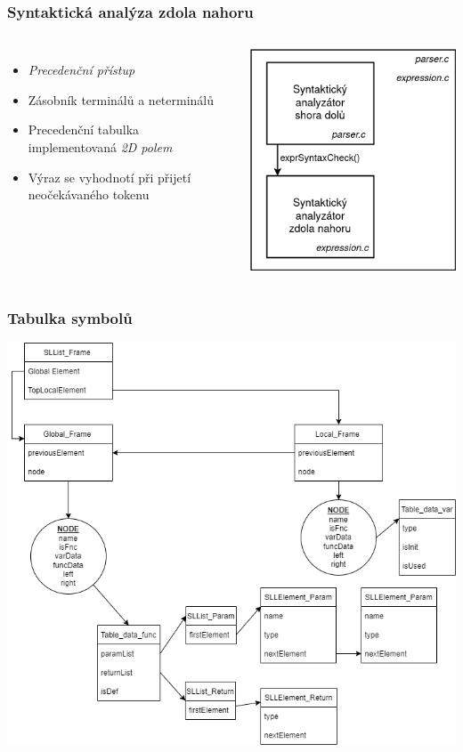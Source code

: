 \begin{frame}\frametitle{Syntaktická analýza zdola nahoru}
  \begin{columns}
    \begin{itemize}
    \setlength\itemsep{1em}
        \item \emph{Precedenční přístup}
        \item Zásobník terminálů a neterminálů
        \item Precedenční tabulka implementovaná \emph{2D polem}
        \item Výraz se vyhodnotí při přijetí neočekávaného tokenu
    \end{itemize}


    \centering
    \includegraphics[scale=0.34,keepaspectratio]{img/DiagramSynt1.png}
    \end{columns}
\end{frame}



\begin{frame}
  \frametitle{Tabulka symbolů}
  \centering
  \includegraphics[scale=0.37]{img/Symtable.png}
\end{frame}



